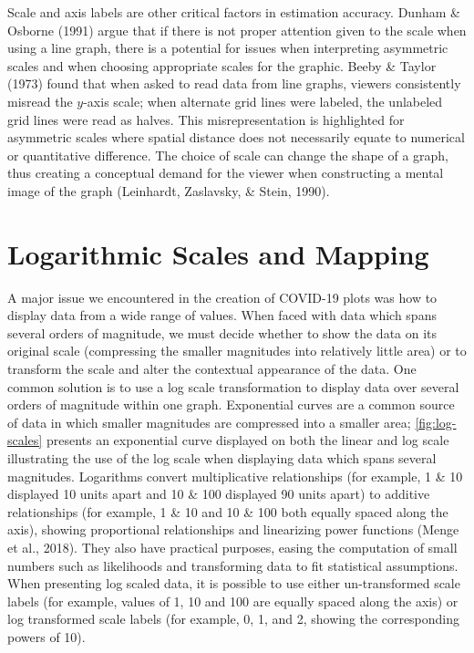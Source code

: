 \documentclass[print]{nuthesis}
\begin{document}
Scale and axis labels are other critical factors in estimation accuracy.
Dunham \& Osborne (1991) argue that if there is not proper attention given to the scale when using a line graph, there is a potential for issues when interpreting asymmetric scales and when choosing appropriate scales for the graphic.
Beeby \& Taylor (1973) found that when asked to read data from line graphs, viewers consistently misread the \(y\)-axis scale; when alternate grid lines were labeled, the unlabeled grid lines were read as halves.
This misrepresentation is highlighted for asymmetric scales where spatial distance does not necessarily equate to numerical or quantitative difference.
The choice of scale can change the shape of a graph, thus creating a conceptual demand for the viewer when constructing a mental image of the graph (Leinhardt, Zaslavsky, \& Stein, 1990).

\hypertarget{logarithmic-scales-and-mapping}{%
\section{Logarithmic Scales and Mapping}\label{logarithmic-scales-and-mapping}}

A major issue we encountered in the creation of COVID-19 plots was how to display data from a wide range of values.
When faced with data which spans several orders of magnitude, we must decide whether to show the data on its original scale (compressing the smaller magnitudes into relatively little area) or to transform the scale and alter the contextual appearance of the data.
One common solution is to use a log scale transformation to display data over several orders of magnitude within one graph.
Exponential curves are a common source of data in which smaller magnitudes are compressed into a smaller area;
\cref{fig:log-scales} presents an exponential curve displayed on both the linear and log scale illustrating the use of the log scale when displaying data which spans several magnitudes.
Logarithms convert multiplicative relationships (for example, 1 \& 10 displayed 10 units apart and 10 \& 100 displayed 90 units apart) to additive relationships (for example, 1 \& 10 and 10 \& 100 both equally spaced along the axis), showing proportional relationships and linearizing power functions (Menge et al., 2018).
They also have practical purposes, easing the computation of small numbers such as likelihoods and transforming data to fit statistical assumptions.
When presenting log scaled data, it is possible to use either un-transformed scale labels (for example, values of 1, 10 and 100 are equally spaced along the axis) or log transformed scale labels (for example, 0, 1, and 2, showing the corresponding powers of 10).
\end{document}
